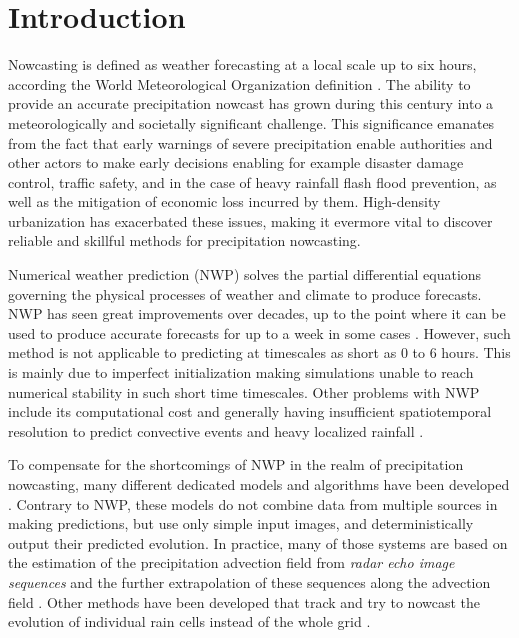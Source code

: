 \chapter{Introduction}
\label{chapter:intro}


Nowcasting is defined as weather forecasting at a local scale up to six hours, according the World Meteorological Organization definition \cite{schmid2019nowcasting}. The ability to provide an accurate precipitation nowcast has grown during this century into a meteorologically and societally significant challenge. This significance emanates from the fact that early warnings of severe precipitation enable authorities and other actors to make early decisions enabling for example disaster damage control, traffic safety, and in the case of heavy rainfall flash flood prevention, as well as the mitigation of economic loss incurred by them. High-density urbanization has exacerbated these issues, making it evermore vital to discover reliable and skillful methods for precipitation nowcasting. 

Numerical weather prediction (NWP) solves the partial differential equations governing the physical processes of weather and climate to produce forecasts. NWP has seen great improvements over decades, up to the point where it can be used to produce accurate forecasts for up to a week in some cases \cite{bauer_quiet_2015}. However, such method is not applicable to predicting at timescales as short as 0 to 6 hours. This is mainly due to imperfect initialization making simulations unable to reach numerical stability in such short time timescales. 
Other problems with NWP include its computational cost and generally having insufficient spatiotemporal resolution to predict convective events and heavy localized rainfall \cite{schultz_can_2021}. 



To compensate for the shortcomings of NWP in the realm of precipitation nowcasting, many different dedicated models and algorithms have been developed \cite{prudden_review_2020}. Contrary to NWP, these models do not combine data from multiple sources in making predictions, but use only simple input images, and deterministically output their predicted evolution. In practice, many of those systems are based on the estimation of the precipitation advection field from \textit{radar echo image sequences} and the further extrapolation of these sequences along the advection field \cite{prudden_review_2020, rinehart_three-dimensional_1978}. Other methods  have been developed that track and try to nowcast the evolution of individual rain cells instead of the whole grid \cite{prudden_review_2020, dixon1993titan}. 

